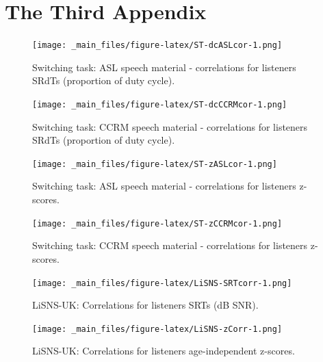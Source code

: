 \documentclass[a4paper, twoside]{templates/ociamthesis}
\newcommand*{\bibtitle}{References}
\begin{document}
\hypertarget{the-third-appendix}{%
\chapter{The Third Appendix}\label{the-third-appendix}}

\begin{figure}
\centering
\texttt{[image: \_main\_files/figure-latex/ST-dcASLcor-1.png]}
\caption{\label{fig:ST-dcASLcor} Switching task: ASL speech material - correlations for listeners SRdTs (proportion of duty cycle).}
\end{figure}

\begin{figure}
\centering
\texttt{[image: \_main\_files/figure-latex/ST-dcCCRMcor-1.png]}
\caption{\label{fig:ST-dcCCRMcor} Switching task: CCRM speech material - correlations for listeners SRdTs (proportion of duty cycle).}
\end{figure}

\begin{figure}
\centering
\texttt{[image: \_main\_files/figure-latex/ST-zASLcor-1.png]}
\caption{\label{fig:ST-zASLcor} Switching task: ASL speech material - correlations for listeners z-scores.}
\end{figure}

\begin{figure}
\centering
\texttt{[image: \_main\_files/figure-latex/ST-zCCRMcor-1.png]}
\caption{\label{fig:ST-zCCRMcor} Switching task: CCRM speech material - correlations for listeners z-scores.}
\end{figure}

\begin{figure}
\centering
\texttt{[image: \_main\_files/figure-latex/LiSNS-SRTcorr-1.png]}
\caption{\label{fig:LiSNS-SRTcorr} LiSNS-UK: Correlations for listeners SRTs (dB SNR).}
\end{figure}

\begin{figure}
\centering
\texttt{[image: \_main\_files/figure-latex/LiSNS-zCorr-1.png]}
\caption{\label{fig:LiSNS-zcorr} LiSNS-UK: Correlations for listeners age-independent z-scores.}
\end{figure}




\setlength{\baselineskip}{0pt} %

{\renewcommand*\MakeUppercase[1]{#1}%
\printbibliography[heading=bibintoc,title={\bibtitle}]}
\end{document}
